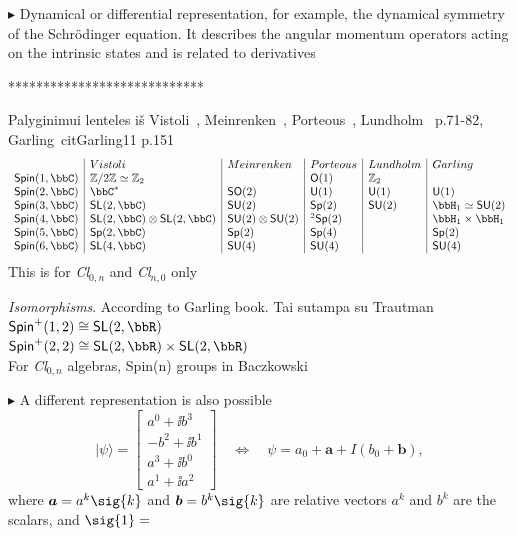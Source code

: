 \vspace{5mm}\noindent $\blacktriangleright$ Dynamical or
differential  representation, for example, the dynamical symmetry
of the Schr{\" o}dinger equation. It describes the angular
momentum operators acting on the intrinsic states and is related
to derivatives

\vspace{5mm} ****************************

 Palyginimui lentel{e}s
i{\v s} Vistoli~\cite{Vistoli07}, Meinrenken~\cite{Meinrenken09},
Porteous~\cite{Porteous95}, Lundholm~\cite{Lundholm09} p.71-82,
Garling~cit{Garling11} p.151
$$\begin{array}{l|l|l|l|l|l}
&Vistoli&Meinrenken&Porteous&Lundholm&Garling\\
\mathsf{Spin}(1,\bbC)&\mathbb{Z}/2\mathbb{Z}\simeq\mathbb{Z}_2&&\mathsf{O}(1)&\mathbb{Z}_2&\\
\mathsf{Spin}(2,\bbC)&\bbC^*&\mathsf{SO}(2)&\mathsf{U}(1)&\mathsf{U}(1)&\mathsf{U}(1)\\
\mathsf{Spin}(3,\bbC)&\mathsf{SL}(2,\bbC)&\mathsf{SU}(2)&\mathsf{Sp}(2)&\mathsf{SU}(2)&\bbH_1\simeq\mathsf{SU}(2)\\
\mathsf{Spin}(4,\bbC)&\mathsf{SL}(2,\bbC)\otimes\mathsf{SL}(2,\bbC)&\mathsf{SU}(2)\otimes\mathsf{SU}(2)&^2\mathsf{Sp}(2)&&\bbH_1\times\bbH_1\\
\mathsf{Spin}(5,\bbC)&\mathsf{Sp}(2,\bbC)&\mathsf{Sp}(2)&\mathsf{Sp}(4)&&\mathsf{Sp}(2)\\
\mathsf{Spin}(6,\bbC)&\mathsf{SL}(4,\bbC)&\mathsf{SU}(4)&\mathsf{SU}(4)&&\mathsf{SU}(4)\\
\end{array}$$
This is for \textit{Cl}$_{0,n}$ and \textit{Cl}$_{n,0}$ only


\textit{Isomorphisms}. According to Garling book. Tai sutampa su Trautman\\
$\mathsf{Spin}^{+}(1,2)\cong\mathsf{SL}(2,\bbR)$\\
$\mathsf{Spin}^{+}(2,2)\cong\mathsf{SL}(2,\bbR)\times
\mathsf{SL}(2,\bbR)$\\
For \textit{Cl}$_{0,n}$ algebras, Spin(n) groups in
Baczkowski~\cite{Baczkowski09}



\vspace{5mm}\noindent$\blacktriangleright$ A different
representation is also possible~\cite{Gull91}
\[\label{DiracSpinor1}
|\psi\rangle = \begin{bmatrix}
 a^0 + \ii b^3 \\
 -b^2 + \ii b^1 \\
 a^3 + \ii b^0 \\
 a^1 + \ii a^2
  \end{bmatrix}\quad\Longleftrightarrow\quad
 \psi = a_0+\boldsymbol{a}+I(b_0+\boldsymbol{b}) ,
\]
where $\boldsymbol{a}=a^k\sig{k}$ and $\boldsymbol{b}=b^k\sig{k}$
are relative vectors $a^k$ and $b^k$ are the scalars, and
$\sig{1}=$

